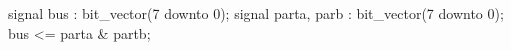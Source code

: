 signal bus : bit_vector(7 downto 0);
signal parta, parb : bit_vector(7 downto 0);
bus <= parta & partb;